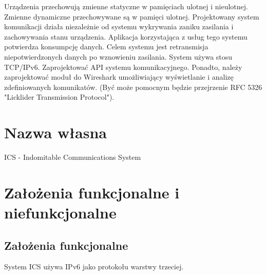 \documentclass{article}
\begin{document}
Urządzenia przechowują zmienne statyczne w pamięciach ulotnej i nieulotnej. Zmienne dynamiczne przechowywane są w pamięci ulotnej. Projektowany system komunikacji działa niezależnie od systemu wykrywania zaniku zasilania i zachowywania stanu urządzenia. Aplikacja korzystająca z usług tego systemu potwierdza konsumpcję danych. Celem systemu jest retransmisja niepotwierdzonych danych po wznowieniu zasilania. System używa stosu TCP/IPv6. Zaprojektować API systemu komunikacyjnego. Ponadto, należy zaprojektować moduł do Wireshark umożliwiający wyświetlanie i analizę zdefiniowanych komunikatów. (Być może pomocnym będzie przejrzenie RFC 5326 "Licklider Transmission Protocol").

\section{Nazwa własna\label{nazwa}}

ICS - Indomitable Communications System
\section{Założenia funkcjonalne i niefunkcjonalne\label{przypf}}
\subsection{Założenia funkcjonalne}

System ICS używa IPv6 jako protokołu warstwy trzeciej.
\end{document}
